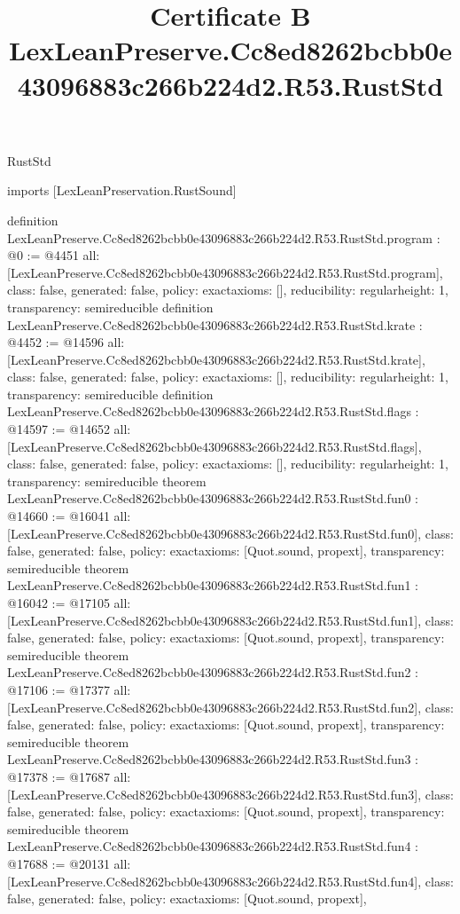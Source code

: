\begin{lexlean}{RustStd}
\title{Certificate B LexLeanPreserve.Cc8ed8262bcbb0e43096883c266b224d2.R53.RustStd}
\begin{coremodule}
imports [LexLeanPreservation.RustSound]

definition LexLeanPreserve.Cc8ed8262bcbb0e43096883c266b224d2.R53.RustStd.program : @0 := @4451 {
  all: [LexLeanPreserve.Cc8ed8262bcbb0e43096883c266b224d2.R53.RustStd.program],
  class: false,
  generated: false,
  policy: exact{axioms: []},
  reducibility: regular{height: 1},
  transparency: semireducible
}
definition LexLeanPreserve.Cc8ed8262bcbb0e43096883c266b224d2.R53.RustStd.krate : @4452 := @14596 {
  all: [LexLeanPreserve.Cc8ed8262bcbb0e43096883c266b224d2.R53.RustStd.krate],
  class: false,
  generated: false,
  policy: exact{axioms: []},
  reducibility: regular{height: 1},
  transparency: semireducible
}
definition LexLeanPreserve.Cc8ed8262bcbb0e43096883c266b224d2.R53.RustStd.flags : @14597 := @14652 {
  all: [LexLeanPreserve.Cc8ed8262bcbb0e43096883c266b224d2.R53.RustStd.flags],
  class: false,
  generated: false,
  policy: exact{axioms: []},
  reducibility: regular{height: 1},
  transparency: semireducible
}
theorem LexLeanPreserve.Cc8ed8262bcbb0e43096883c266b224d2.R53.RustStd.fun0 : @14660 := @16041 {
  all: [LexLeanPreserve.Cc8ed8262bcbb0e43096883c266b224d2.R53.RustStd.fun0],
  class: false,
  generated: false,
  policy: exact{axioms: [Quot.sound, propext]},
  transparency: semireducible
}
theorem LexLeanPreserve.Cc8ed8262bcbb0e43096883c266b224d2.R53.RustStd.fun1 : @16042 := @17105 {
  all: [LexLeanPreserve.Cc8ed8262bcbb0e43096883c266b224d2.R53.RustStd.fun1],
  class: false,
  generated: false,
  policy: exact{axioms: [Quot.sound, propext]},
  transparency: semireducible
}
theorem LexLeanPreserve.Cc8ed8262bcbb0e43096883c266b224d2.R53.RustStd.fun2 : @17106 := @17377 {
  all: [LexLeanPreserve.Cc8ed8262bcbb0e43096883c266b224d2.R53.RustStd.fun2],
  class: false,
  generated: false,
  policy: exact{axioms: [Quot.sound, propext]},
  transparency: semireducible
}
theorem LexLeanPreserve.Cc8ed8262bcbb0e43096883c266b224d2.R53.RustStd.fun3 : @17378 := @17687 {
  all: [LexLeanPreserve.Cc8ed8262bcbb0e43096883c266b224d2.R53.RustStd.fun3],
  class: false,
  generated: false,
  policy: exact{axioms: [Quot.sound, propext]},
  transparency: semireducible
}
theorem LexLeanPreserve.Cc8ed8262bcbb0e43096883c266b224d2.R53.RustStd.fun4 : @17688 := @20131 {
  all: [LexLeanPreserve.Cc8ed8262bcbb0e43096883c266b224d2.R53.RustStd.fun4],
  class: false,
  generated: false,
  policy: exact{axioms: [Quot.sound, propext]},
}
\end{coremodule}
\end{lexlean}
